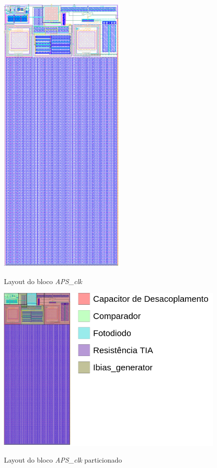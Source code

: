 \begin{figure}[htb]
 \centering
    \centering
    \caption{Layout do bloco \textit{APS\_clk}} 
    \includegraphics[scale=0.7]{Resultados/Imagens/TIA.png}
    \label{layoutTIA}
\end{figure}

\begin{figure}[htb]
 \centering
    \centering
    \caption{Layout do bloco \textit{APS\_clk} particionado}
    \includegraphics[scale=0.3]{Resultados/Imagens/Image_TIA.png}
    \label{layoutTIA_division}
\end{figure}


